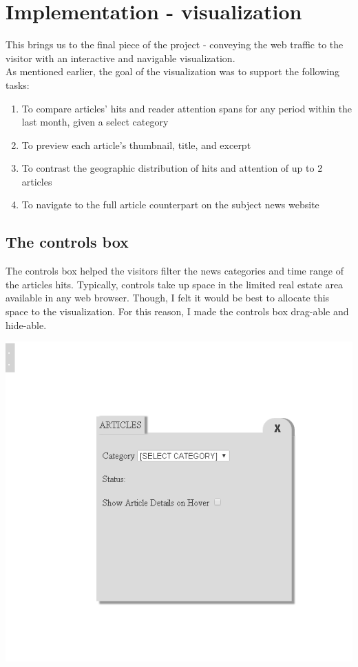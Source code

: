\documentclass[12pt]{article}
\begin{document}
\newpage

\section{Implementation - visualization}

This brings us to the final piece of the project - conveying the web traffic to the visitor with an interactive and navigable visualization. \\ As mentioned earlier, the goal of the visualization was to support the following tasks:
\begin{enumerate}
\item To compare articles' hits and reader attention spans for any period within the last month, given a select category
\item To preview each article's thumbnail, title, and excerpt
\item To contrast the geographic distribution of hits and attention of up to 2 articles
\item To navigate to the full article counterpart on the subject news website
\end{enumerate}

\subsection{The controls box}

The controls box helped the visitors filter the news categories and time range of the articles hits. Typically, controls take up space in the limited real estate area available in any web browser. Though, I felt it would be best to allocate this space to the visualization. For this reason, I made the controls box drag-able and hide-able.

\noindent\includegraphics[scale=0.8]{img/viz_3}
\end{document}
